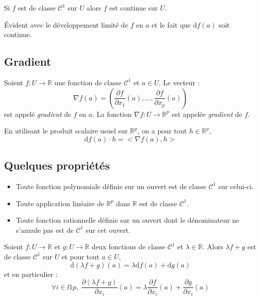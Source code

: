 \documentclass[french,11pt,twoside]{VcCours}
\begin{document}
\begin{Proposition}{} Si $f$ est de classe $\mathcal{C}^1$ sur $U$ alors $f$ est continue sur $U$.
\end{Proposition}

\begin{Demonstration}{} Évident avec le développement limité de $f$ en $a$ et le fait que $\textrm{d}f(a)$ soit continue.
\end{Demonstration}

\subsection{Gradient}

\begin{Definition}{} Soient $f : U \rightarrow \mathbb{R}$ une fonction de classe $\mathcal{C}^1$ et $a \in U$. Le vecteur :
$$ \nabla f(a) = \left(\dfrac{\partial f}{\partial x_1}(a), \ldots,   \dfrac{\partial f}{\partial x_p}(a) \right) $$
est appelé \emph{gradient} de $f$ en $a$. La fonction $\nabla f : U \rightarrow \mathbb{R}^p$ est appelée \emph{gradient} de $f$.
\end{Definition}

\begin{Remarque}{} En utilisant le produit scalaire usuel sur $\mathbb{R}^p$, on a pour tout $h \in \mathbb{R}^p$,
$$ \textrm{d}f(a) \cdot h = < \nabla f(a),h>$$
\end{Remarque}
\subsection{Quelques propriétés}

\begin{Proposition}{} 
\begin{itemize}
\item Toute fonction polynomiale définie sur un ouvert est de classe $\mathcal{C}^1$ sur celui-ci.
\item Toute application linéaire de $\mathbb{R}^p$ dans $\mathbb{R}$ est de classe $\mathcal{C}^1$.
\item Toute fonction rationnelle définie sur un ouvert dont le dénominateur ne s'annule pas est de $\mathcal{C}^1$ sur cet ouvert.
\end{itemize}
\end{Proposition}

\begin{Proposition}{} Soient $f : U \rightarrow \mathbb{R}$ et $g :  U \rightarrow \mathbb{R}$ deux fonctions de classe $\mathcal{C}^1$ et $\lambda \in \mathbb{R}$. Alors $\lambda f+g$ est de classe $\mathcal{C}^1$ sur $U$ et pour tout $a \in U$,
$$ \textrm{d}(\lambda f + g)(a) = \lambda \textrm{d}f(a)+\textrm{d}g(a)$$
et en particulier :
$$ \forall i \in \ii{1}{p}, \; \dfrac{\partial (\lambda f +g)}{\partial x_i}(a) = \lambda \dfrac{\partial f}{\partial x_i}(a) +  \dfrac{\partial g}{\partial x_i}(a)$$
\end{Proposition}
\end{document}
